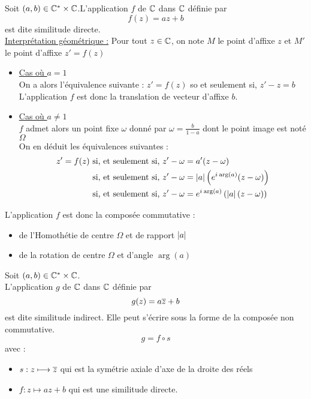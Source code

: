 \begin{defprop}
    Soit  \((a,b) \in \mathbb{C}^*\times\mathbb{C}\).L'application \(f\) de \(\mathbb{C}\) dans \(\mathbb{C}\) définie par 
    \[f(z) = az+b\]
    est dite similitude directe. \\
    \underline{Interprétation géométrique :}
    Pour tout \(z\in \mathbb{C}\), on note \(M\) le point d'affixe \(z\) et \(M'\) le point d'affixe \(z' = f(z)\)
    \begin{itemize}
        \item \underline{Cas où \(a=1\)} \\
        On a alors l'équivalence suivante : \(z' = f(z)\) so et seulement si, \(z'-z = b\) \\
        L'application \(f\) est donc la translation de vecteur d'affixe \(b\).
        \item\underline{Cas où \(a\neq1\)}\\ 
        \(f\) admet alors un point fixe \(\omega\) donné par \(\omega = \frac{b}{1-a} \) dont le point image est noté \(\Omega\) \\
        On en déduit les équivalences suivantes :  \\
        \begin{align*}
            z' = f(z) &\text{ si, et seulement si, } z'-\omega = a'(z-\omega) \\
                      &\text{ si, et seulement si, } z'-\omega  = \left\lvert a\right\rvert\left(e^{i\mkern1mu \arg(a)}(z-\omega)\right) \\
                      &\text{ si, et seulement si, } z'-\omega  = e^{i\mkern1mu \arg(a)}\left(\left\lvert a\right\rvert(z-\omega)\right) \\
        \end{align*}
    \end{itemize}
    L'application \(f\) est donc la composée commutative : 
    \begin{itemize}
        \item de l'Homothétie de centre \(\Omega\) et de rapport \(\left\lvert a\right\rvert\)
        \item de la rotation de centre \(\Omega\) et d'angle \(\arg(a)\)
    \end{itemize}
\end{defprop}

\begin{defprop}
    Soit  \((a,b) \in \mathbb{C}^*\times\mathbb{C}\). \\
    L'application \(g\) de \(\mathbb{C}\) dans \(\mathbb{C}\) définie par 
    \[g(z) = a\overline{z}+b\]
    est dite similitude indirect. Elle peut s'écrire sous la forme de la composée non commutative. 
    \[g = f \circ s\]
    avec :
    \begin{itemize}
        \item \(s:z\longmapsto \overline{z}\) qui est la symétrie axiale d'axe de la droite des réels
        \item \(f:z\mapsto az+b\) qui est une similitude directe.
    \end{itemize}
\end{defprop}